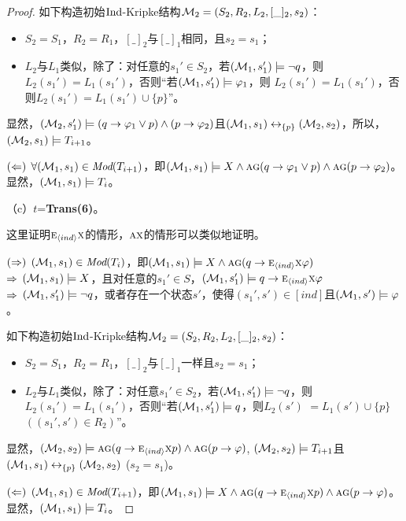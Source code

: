 \begin{proof}
	如下构造初始$\textrm{Ind}$-Kripke结构${\cal M}_2=(S_2,R_2,L_2,[\_]_2,s_2)$：
	\begin{itemize}
		\item $S_2=S_1$，$R_2=R_1$，$[\_]_2$与$[\_]_1$相同，且$s_2=s_1$；
		\item $L_2$与$L_1$类似，除了：对任意的$s_1'\in S_2$，若$({\cal M}_1, s_1') \models \neg q$，则$L_2(s_1') = L_1(s_1')$，否则“若$({\cal M}_1,s_1') \models \varphi_1$，则 $L_2(s_1')=L_1(s_1')$，否则$L_2(s_1')=L_1(s_1') \cup \{p\}$”。
	\end{itemize}
	显然，$({\cal M}_2,s_1') \models (q\rightarrow \varphi_1 \vee p) \wedge (p \rightarrow \varphi_2)$且$({\cal M}_1, s_1) \leftrightarrow_{\{p\}} ({\cal M}_2, s_2)$，所以，$({\cal M}_2,s_1) \models T_{i+1}$。
	
	$(\Leftarrow)$  $\forall ({\cal M}_1, s_1) \in \textit{Mod}(T_{i+1})$，即$({\cal M}_1,s_1) \models X \wedge \textsc{a}\textsc{g} (q\rightarrow \varphi_1 \vee p) \wedge \textsc{a}\textsc{g}(p \rightarrow \varphi_2)$。 显然，$({\cal M}_1, s_1) \models T_i$。
	
	（c）$t$=\textbf{Trans(6)}。
	
	这里证明$\textsc{e}_{{\langle{ind}\rangle}} \textsc{x}$的情形，$\textsc{a} \textsc{x}$的情形可以类似地证明。
	
	$(\Rightarrow)$ $({\cal M}_1,s_1) \in \textit{Mod}(T_i)$，即$({\cal M}_1,s_1) \models X \wedge \textsc{a}\textsc{g}(q \rightarrow \textsc{e}_{{\langle{ind}\rangle}}\textsc{x} \varphi)$\\
	$\Rightarrow$ $({\cal M}_1,s_1) \models X$，且对任意的$s_1'\in S$，$({\cal M}_1,s_1') \models q \rightarrow \textsc{e}_{{\langle{ind}\rangle}} \textsc{x} \varphi$\\
	$\Rightarrow$ $({\cal M}_1,s_1') \models \neg q$，或者存在一个状态$s'$，使得$(s_1', s') \in [ind]$且$({\cal M}_1,s') \models \varphi$。
	
	如下构造初始$\textrm{Ind}$-Kripke结构${\cal M}_2=(S_2,R_2,L_2,[\_]_2,s_2)$：
	\begin{itemize}
		\item $S_2=S_1$，$R_2=R_1$，$[\_]_2$与$[\_]_1$一样且$s_2=s_1$；
		\item $L_2$与$L_1$类似，除了：对任意$s_1'\in S_2$，若$({\cal M}_1, s_1') \models \neg q$，则$L_2(s_1') = L_1(s_1')$，否则“若$({\cal M}_1,s_1') \models q$，则$L_2(s')$ $=L_1(s')\cup \{p\}$ $((s_1',s')\in R_2)$”。
	\end{itemize}
	显然，$({\cal M}_2,s_2) \models \textsc{a}\textsc{g}(q\rightarrow \textsc{e}_{{\langle{ind}\rangle}} \textsc{x} p) \wedge \textsc{a}\textsc{g}(p \rightarrow \varphi)$, $({\cal M}_2,s_2) \models T_{i+1}$且$({\cal M}_1, s_1) \leftrightarrow_{\{p\}} ({\cal M}_2, s_2)$ ($s_2=s_1$)。
	
	$(\Leftarrow)$ $({\cal M}_1, s_1) \in \textit{Mod}(T_{i+1})$，即$({\cal M}_1,s_1) \models X \wedge \textsc{a}\textsc{g}(q\rightarrow \textsc{e}_{{\langle{ind}\rangle}} \textsc{x} p) \wedge \textsc{a}\textsc{g}(p \rightarrow \varphi)$。显然，$({\cal M}_1, s_1) \models T_i$。
\end{proof}

